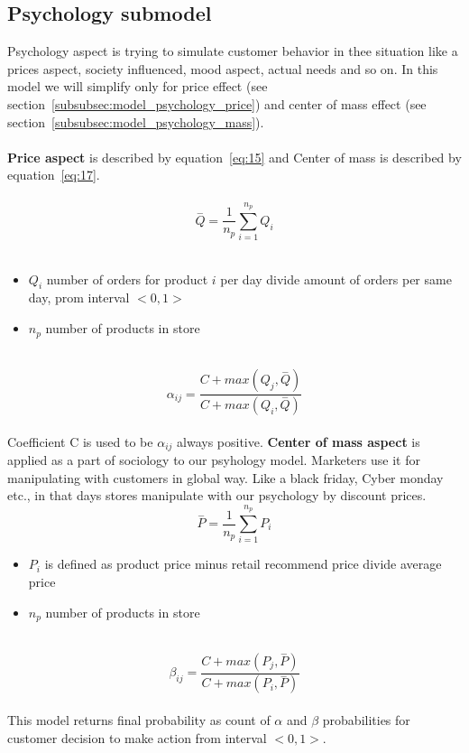 \subsection{Psychology submodel} \label{subsec:model_psychology}
Psychology aspect is trying to simulate customer behavior in thee situation like a prices aspect, society influenced, mood aspect, actual needs
and so on.
In this model we will simplify only for price effect (see section~\ref{subsubsec:model_psychology_price}) and center of mass effect (see section~\ref{subsubsec:model_psychology_mass}).\\
\\
\textbf{Price aspect} \label{subsubsec:model_psychology_price} is described by equation~\ref{eq:15} and Center of mass is described by equation~\ref{eq:17}.\\
\\
\begin{equation} \label{eq:15}
\overset{-}{Q} = \frac{1}{n_p} \sum_{i=1}^{n_p} Q_i
\end{equation}
\\
\begin{itemize}
    \item $Q_i$ number of orders for product $i$ per day divide amount of orders per same day, prom interval $<0,1>$
    \item $n_p$ number of products in store
\end{itemize}
\\
\begin{equation} \label{eq:16}
\alpha_{ij} = \frac{C+max(Q_j, \overset{-}{Q})}{C+max(Q_i, \overset{-}{Q})}
\end{equation}
\\
Coefficient C is used to be $\alpha_{ij}$ always positive.
\textbf{Center of mass aspect} \label{subsubsec:model_psychology_mass} is applied as a part of sociology to our psyhology model.
Marketers use it for manipulating with customers in global way.
Like a black friday, Cyber monday etc., in that days stores manipulate with our psychology by discount prices.
\\
\begin{equation} \label{eq:17}
\overset{-}{P} = \frac{1}{n_p} \sum_{i=1}^{n_p} P_i
\end{equation}
\begin{itemize}
    \item $P_i$ is defined as product price minus retail recommend price divide average price
    \item $n_p$ number of products in store
\end{itemize}
\\
\begin{equation} \label{eq:18}
\beta_{ij} = \frac{C+max(P_j, \overset{-}{P})}{C+max(P_i, \overset{-}{P})}
\end{equation}
\\
This model returns final probability as count of $\alpha$ and $\beta$ probabilities for customer decision to make action from interval $<0,1>$.
\\
